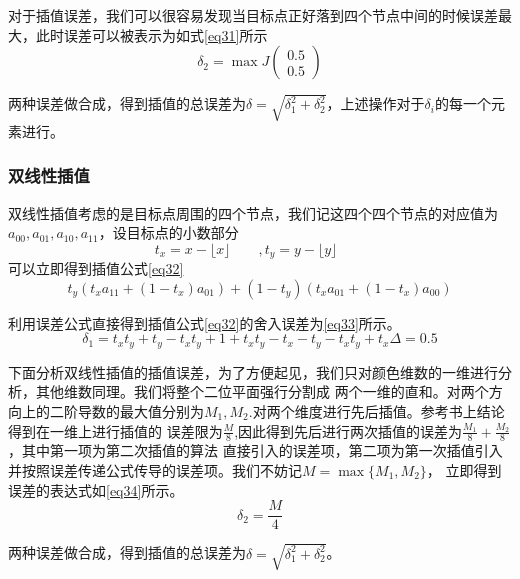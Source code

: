 \documentclass[UTF8,a4paper]{paper}
\begin{document}
对于插值误差，我们可以很容易发现当目标点正好落到四个节点中间的时候误差最大，此时误差可以被表示为如式\ref{eq31}所示
\begin{equation}\delta_2 = \max J\begin{pmatrix}0.5 \\ 0.5 \end{pmatrix}\label{eq31}\end{equation}

两种误差做合成，得到插值的总误差为$\delta = \sqrt{\delta_1^2 + \delta_2^2}$，上述操作对于$\delta_i$的每一个元素进行。
\subsubsection{双线性插值}
双线性插值考虑的是目标点周围的四个节点，我们记这四个四个节点的对应值为$a_{00},a_{01},a_{10},a_{11}$，设目标点的小数部分
$$t_x = x - \biggl\lfloor x\biggr\rfloor\qquad, t_y = y - \biggl\lfloor y\biggr\rfloor\qquad$$
可以立即得到插值公式\ref{eq32}
\begin{equation} t_y(t_xa_{11} + (1-t_x)a_{01}) + (1-t_y)(t_xa_{01} + (1-t_x)a_{00})\label{eq32}\end{equation}

利用误差公式直接得到插值公式\ref{eq32}的舍入误差为\ref{eq33}所示。
\begin{equation} \delta_1 = t_xt_y + t_y - t_xt_y + 1 + t_xt_y  - t_x - t_y -t_xt_y + t_x \Delta = 0.5
\label{eq33}\end{equation}

下面分析双线性插值的插值误差，为了方便起见，我们只对颜色维数的一维进行分析，其他维数同理。我们将整个二位平面强行分割成
两个一维的直和。对两个方向上的二阶导数的最大值分别为$M_1,M_2$.对两个维度进行先后插值。参考书上结论得到在一维上进行插值的
误差限为$\frac{M}{8}$,因此得到先后进行两次插值的误差为$\frac{M_1}{8} + \frac{M_2}{8}$，其中第一项为第二次插值的算法
直接引入的误差项，第二项为第一次插值引入并按照误差传递公式传导的误差项。我们不妨记$M = \max\{M_1,M_2\}$，
立即得到误差的表达式如\ref{eq34}所示。\begin{equation}\delta_2 = \frac{M}{4}\label{eq34}\end{equation}

两种误差做合成，得到插值的总误差为$\delta = \sqrt{\delta_1^2 + \delta_2^2}$。
\end{document}
